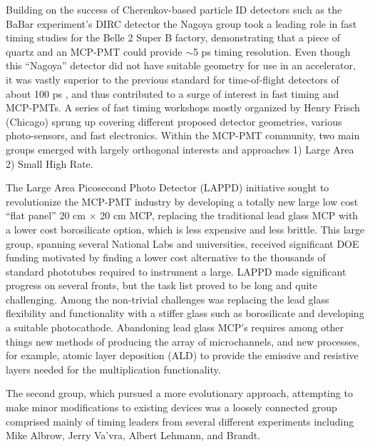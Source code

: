 
Building on the success of Cherenkov-based particle ID detectors such as the BaBar experiment's DIRC detector\cite{DIRC} the Nagoya group\cite{Nagoya} took a leading role in fast timing studies for the Belle 2 Super B factory, demonstrating that a piece of quartz and an MCP-PMT could provide  $\sim$5 ps timing resolution\cite{Nagdet}. Even though this ``Nagoya'' detector did not have suitable geometry for use in an accelerator, it was vastly superior to the previous standard for time-of-flight detectors of about 100 ps \cite{TOF}, and thus contributed to a surge of interest in fast timing and MCP-PMTs.  A series of fast timing workshops mostly organized by Henry Frisch (Chicago) sprung up covering different proposed detector geometries, various photo-sensors, and fast electronics. Within the MCP-PMT community, two main groups emerged with largely orthogonal interests and approaches 1) Large Area 2) Small High Rate.  

The Large Area Picosecond Photo Detector (LAPPD)\cite{LAPPD} initiative  sought to revolutionize the MCP-PMT industry by developing a totally new large low cost ``flat panel'' 20 cm $\times$ 20 cm MCP, replacing the traditional lead glass MCP with a lower cost borosilicate option, which is less expensive and less brittle. This large group, spanning several National Labs and universities, received significant DOE funding motivated by finding a lower cost alternative to the thousands of standard phototubes required to instrument a large. LAPPD made significant progress on several fronts, but the task list proved to be long and quite challenging. Among the non-trivial challenges was replacing the lead glass flexibility and functionality with a stiffer glass such as borosilicate and developing a suitable photocathode. Abandoning lead glass MCP's requires among other things new methods of producing the array of microchannels, and new processes, for example, atomic layer deposition (ALD) to provide the emissive and resistive layers needed for the multiplication functionality. 

The second group, which pursued a more evolutionary approach, attempting to make minor modifications to existing devices was a loosely connected group comprised mainly of timing leaders from several different experiments including Mike Albrow, Jerry Va'vra, Albert Lehmann, and Brandt.


